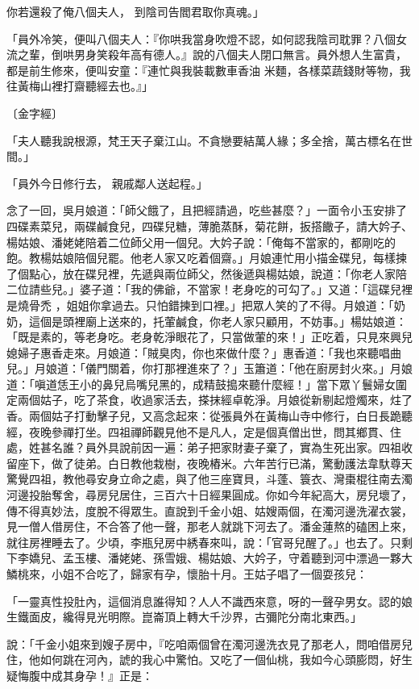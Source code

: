 你若還殺了俺八個夫人，  到陰司告閻君取你真魂。」

「員外冷笑，便叫八個夫人：『你哄我當身吹燈不認，如何認我陰司耽罪？八個女流之輩，倒哄男身笑殺年高有德人。』說的八個夫人閉口無言。員外想人生富貴，都是前生修來，便叫安童：『連忙與我裝載數車香油 米麵，各樣菜蔬錢財等物，我往黃梅山裡打齋聽經去也。』」

〔金字經〕

「夫人聽我說根源，梵王天子棄江山。不貪戀要結萬人緣；多全捨，萬古標名在世間。」

「員外今日修行去，  親戚鄰人送起程。」

念了一回，吳月娘道：「師父餓了，且把經請過，吃些甚麼？」一面令小玉安排了四碟素菜兒，兩碟鹹食兒，四碟兒糖，薄脆蒸酥，菊花餅，扳搭饊子，請大妗子、楊姑娘、潘姥姥陪着二位師父用一個兒。大妗子說：「俺每不當家的，都剛吃的飽。教楊姑娘陪個兒罷。他老人家又吃着個齋。」月娘連忙用小描金碟兒，每樣揀了個點心，放在碟兒裡，先遞與兩位師父，然後遞與楊姑娘，說道：「你老人家陪二位請些兒。」婆子道：「我的佛爺，不當家！老身吃的可勾了。」又道：「這碟兒裡是燒骨禿 ，姐姐你拿過去。只怕錯揀到口裡。」把眾人笑的了不得。月娘道：「奶奶，這個是頭裡廟上送來的，托葷鹹食，你老人家只顧用，不妨事。」楊姑娘道：「既是素的，等老身吃。老身乾淨眼花了，只當做葷的來！」正吃着，只見來興兒媳婦子惠香走來。月娘道：「賊臭肉，你也來做什麼？」惠香道：「我也來聽唱曲兒。」月娘道：「儀門關着，你打那裡進來了？」玉簫道：「他在廚房封火來。」月娘道：「嗔道恁王小的鼻兒烏嘴兒黑的，成精鼓搗來聽什麼經！」當下眾丫鬟婦女圍定兩個姑子，吃了茶食，收過家活去，搽抹經卓乾淨。月娘從新剔起燈燭來，炷了香。兩個姑子打動擊子兒，又高念起來：從張員外在黃梅山寺中修行，白日長跪聽經，夜晚參禪打坐。四祖禪師觀見他不是凡人，定是個真僧出世，問其鄉貫、住處，姓甚名誰？員外具說前因一遍：弟子把家財妻子棄了，實為生死出家。四祖收留座下，做了徒弟。白日教他栽樹，夜晚樁米。六年苦行已滿，驚動護法韋馱尊天驚覺四祖，教他尋安身立命之處，與了他三座寶貝，斗蓬、簑衣、灣棗棍往南去濁河邊投胎奪舍，尋房兒居住，三百六十日經果圓成。你如今年紀高大，房兒壞了，傳不得真妙法，度脫不得眾生。直說到千金小姐、姑嫂兩個，在濁河邊洗濯衣裳，見一僧人借房住，不合答了他一聲，那老人就跳下河去了。潘金蓮熬的磕困上來，就往房裡睡去了。少頃，李瓶兒房中綉春來叫，說：「官哥兒醒了。」也去了。只剩下李嬌兒、孟玉樓、潘姥姥、孫雪娥、楊姑娘、大妗子，守着聽到河中漂過一夥大鱗桃來，小姐不合吃了，歸家有孕，懷胎十月。王姑子唱了一個耍孩兒：

「一靈真性投肚內，這個消息誰得知？人人不識西來意，呀的一聲孕男女。認的娘生鐵面皮，纔得見光明際。崑崙頂上轉大千沙界，古彌陀分南北東西。」

說：「千金小姐來到嫂子房中，『吃咱兩個曾在濁河邊洗衣見了那老人，問咱借房兒住，他如何跳在河內，諕的我心中驚怕。又吃了一個仙桃，我如今心頭膨悶，好生疑悔腹中成其身孕！』正是：

